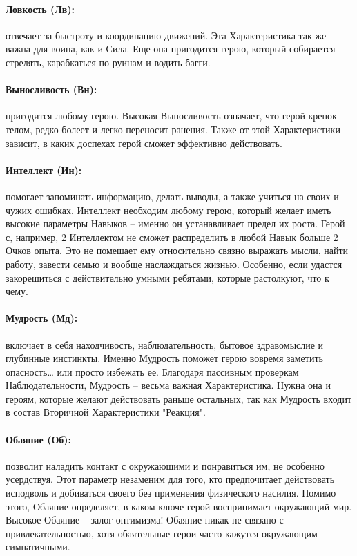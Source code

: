 \paragraph{Ловкость (Лв):} отвечает за быстроту и координацию движений. Эта Характеристика так же важна для воина, как и Сила. Еще она пригодится герою, который собирается стрелять, карабкаться по руинам и водить багги.

\paragraph{Выносливость (Вн):} пригодится любому герою. Высокая Выносливость означает, что герой крепок телом, редко болеет и легко переносит ранения. Также от этой Характеристики зависит, в каких доспехах герой сможет эффективно действовать.

\paragraph{Интеллект (Ин):} помогает запоминать информацию, делать выводы, а также учиться на своих и чужих ошибках. Интеллект необходим любому герою, который желает иметь высокие параметры Навыков – именно он устанавливает предел их роста.
\newline Герой с, например, 2 Интеллектом не сможет распределить в любой Навык больше 2 Очков опыта. Это не помешает ему относительно связно выражать мысли, найти работу, завести семью и вообще наслаждаться жизнью. Особенно, если удастся закорешиться с действительно умными ребятами, которые растолкуют, что к чему. 

\paragraph{Мудрость (Мд):} включает в себя находчивость, наблюдательность, бытовое здравомыслие и глубинные инстинкты. Именно Мудрость поможет герою вовремя заметить опасность… или просто избежать ее.
\newline Благодаря пассивным проверкам Наблюдательности, Мудрость – весьма важная Характеристика. Нужна она и героям, которые желают действовать раньше остальных, так как Мудрость входит в состав Вторичной Характеристики "Реакция".

\paragraph{Обаяние (Об):} позволит наладить контакт с окружающими и понравиться им, не особенно усердствуя. Этот параметр незаменим для того, кто предпочитает действовать исподволь и добиваться своего без применения физического насилия. Помимо этого, Обаяние определяет, в каком ключе герой воспринимает окружающий мир. Высокое Обаяние – залог оптимизма!
\newline Обаяние никак не связано с привлекательностью, хотя обаятельные герои часто кажутся окружающим симпатичными. 

